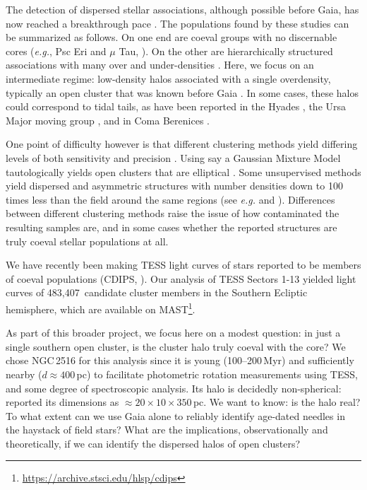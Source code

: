 \documentclass[12pt,twocolumn,tighten]{aastex63}
\newcommand{\numsouthernuniqlcs}{483{,}407\ } %
\begin{document}
The detection of dispersed stellar associations, although possible
before Gaia, has now reached a breakthrough pace \citep[{\it
e.g.},][]{bergond_gravitational_2001,zuckerman_young_2004,oh_comoving_2017,cantatgaudin_gaia_2018,gagne_banyan_XII_2018,gagne_banyan_XIII_2018,kounkel_apogee2_2018,zari_3d_2018,kounkel_untangling_2019,furnkranz_comabernbhr_2019}.
The populations found by these studies can be summarized as follows.
On one end are coeval groups with no discernable cores ({\it e.g.},
Psc Eri and $\mu$ Tau,
\citealt{meingast_psceri_2019,curtis_tess_2019,gagne_mutau_2020}).  On
the other are hierarchically structured associations with many over
and under-densities  \citep[{\it e.g.} the Sco-Cen and Vela
associations][]{pecaut_star_2016,cantatgaudin_velaOB2_2019}.  Here, we focus on
an intermediate regime: low-density halos associated with a single
overdensity, typically an open cluster that was known before Gaia
\citep[see][]{kounkel_untangling_2019,kounkel_untanglingII_2020,meingast_2021}.
In some cases, these halos could correspond to tidal tails, as have
been reported in the Hyades
\citep{meingast_hyades_2019,roser_hyades_2019}, the Ursa Major moving
group \citep{gagne_lowmassUMA_2020}, and in Coma Berenices
\citep{tang_comaber_2019}. 

One point of difficulty however is that different clustering methods
yield differing levels of both sensitivity and precision
\citep{hunt_clustering_2020}.  Using say a Gaussian Mixture Model
tautologically yields open clusters that are elliptical \citep[{\it
e.g.},][]{wallace_m4_2018}.  Some unsupervised methods yield dispersed
and asymmetric structures with number densities down to 100 times less
than the field around the same regions (see {\it e.g.}
\citealt{kounkel_untangling_2019} and \citealt{meingast_2021}).
Differences between different clustering methods raise the issue of
how contaminated the resulting samples are, and in some cases whether
the reported structures are truly coeval stellar populations at all.

We have recently been making TESS light curves of stars reported to be
members of coeval populations (CDIPS, \citealt{bouma_cdipsI_2019}).
Our analysis of TESS Sectors 1-13 yielded light curves of
\numsouthernuniqlcs candidate cluster members in the Southern Ecliptic
hemisphere, which are available on
MAST\footnote{\url{https://archive.stsci.edu/hlsp/cdips}}.

As part of this broader project, we focus here on a modest question:
in just a single southern open cluster, is the cluster halo truly
coeval with the core?  We chose NGC\,2516 for this analysis since it
is young (100--200\,Myr) and sufficiently nearby ($d\approx400$\,pc)
to facilitate photometric rotation measurements using TESS, and some
degree of spectroscopic analysis.  Its halo is decidedly
non-spherical: \citet{kounkel_untangling_2019} reported its dimensions
as $\approx20\times10\times350$\,pc.  We want to know: is the halo
real? To what extent can we use Gaia alone to reliably identify
age-dated needles in the haystack of field stars?  What are the
implications, observationally and theoretically, if we can identify
the dispersed halos of open clusters?
\end{document}
